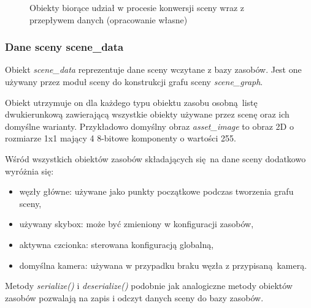 \begin{figure}[H]
	\caption{Obiekty biorące udział w procesie konwersji sceny wraz z przepływem danych (opracowanie własne)}
	\label{scene_process}
\end{figure}

\subsubsection{Dane sceny scene\_data}
Obiekt \textit{scene\_data} reprezentuje dane sceny wczytane z bazy zasobów. Jest one używany przez moduł sceny do konstrukcji grafu sceny \textit{scene\_graph}.

Obiekt utrzymuje on dla każdego typu obiektu zasobu osobną listę dwukierunkową zawierającą wszystkie obiekty używane przez scenę oraz ich domyślne warianty. Przykładowo domyślny obraz \textit{asset\_image} to obraz 2D o rozmiarze 1x1 mający 4 8-bitowe komponenty o wartości 255.

Wśród wszystkich obiektów zasobów składających się na dane sceny dodatkowo wyróżnia się:
\begin{itemize}
	\item węzły główne: używane jako punkty początkowe podczas tworzenia grafu sceny,
	\item używany skybox: może być zmieniony w konfiguracji zasobów,
	\item aktywna czcionka: sterowana konfiguracją globalną,
	\item domyślna kamera: używana w przypadku braku węzła z przypisaną kamerą.
\end{itemize}

Metody \textit{serialize()} i \textit{deserialize()} podobnie jak analogiczne metody obiektów zasobów pozwalają na zapis i odczyt danych sceny do bazy zasobów.

